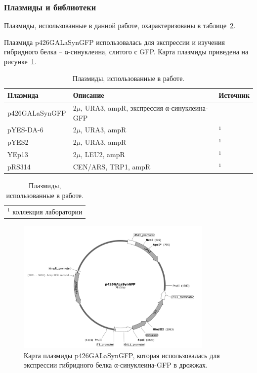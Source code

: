 \subsubsection{Плазмиды и библиотеки} 
\label{subsec:libs}

Плазмиды, использованные в данной работе, охарактеризованы в таблице~\ref{table:plasmids}. 

Плазмида p426GALaSynGFP \cite{outeiro_yeast_2003} использовалась для экспрессии и изучения гибридного белка -- α-синуклеина, слитого с GFP. Карта плазмиды приведена на рисунке~\ref{fig:plasmid}.


\begin{table}[p]
	\small
	\caption{Плазмиды, использованные в работе.}
	\label{table:plasmids}
	\begin{tabular}{ 
		p{0.3\width - \tabcolsep}
		p{0.55\width - 2\tabcolsep} 
		p{0.15\width - \tabcolsep} }
	\graytable
	\toprule
	Плазмида & Описание & Источник \\ \midrule

	p426GALaSynGFP  &
		2$\mu$, URA3, ampR, экспрессия α-синуклеина-GFP&
		\cite{outeiro_yeast_2003} \\
	pYES-DA-6 &
		2$\mu$, URA3, ampR & $^1$ \\
	pYES2 &
		2$\mu$, URA3, ampR & $^1$\\	
	YEp13 &
		2$\mu$, LEU2, ampR & $^1$ \\
	pRS314 &
		CEN/ARS, TRP1, ampR & $^1$\\

	\bottomrule
	\end{tabular}
	\begin{tabular}{p{1\width}}
			$^1$ коллекция лаборатории \\
	\end{tabular}
	
\end{table}

\begin{figure}[p]
	\centering
	\includegraphics[width = 0.85\textwidth]{pics/p426GALaSyn_Map}
	\caption{Карта плазмиды p426GALaSynGFP, которая использовалась для экспрессии гибридного белка α-синуклеина-GFP в дрожжах.  }
	\label{fig:plasmid}	
\end{figure}


